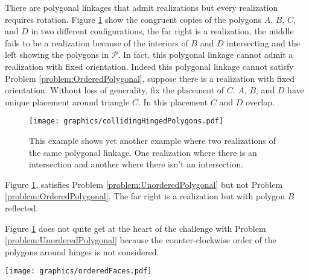\documentclass[10pt]{CSUNthesis}
\theoremstyle{plain}%
\theoremstyle{definition}
\theoremstyle{remark}
\renewcommand{\PP}{{\mathcal{P}}} %
\begin{document}
There are polygonal linkages that admit realizations but every realization requires rotation.
Figure \ref{fig:collidingHingedPolygons} show the congruent copies of the polygons $A$, $B$, $C$, and $D$ in two different configurations, the far right is a realization, the middle fails to be a realization because of the interiors of $B$ and $D$ intersecting and the left showing the polygons in $\PP$.  
In fact, this polygonal linkage cannot admit a realization with fixed orientation.
Indeed this polygonal linkage cannot satisfy Problem \ref{problem:OrderedPolygonal}, suppose there is a realization with fixed orientation.  
Without loss of generality, fix the placement of $C$.
$A$, $B$, and $D$ have unique placement around triangle $C$.  
In this placement $C$ and $D$ overlap.%
\begin{figure}[!htbp]\begin{center}
\texttt{[image: graphics/collidingHingedPolygons.pdf]}
\end{center} 
\caption{This example shows yet another example where two realizations of the same polygonal linkage. 
 One realization where there is an intersection and another where there isn't an intersection.}\label{fig:collidingHingedPolygons}
\end{figure}
Figure \ref{fig:collidingHingedPolygons}, satisfies Problem \ref{problem:UnorderedPolygonal} but not Problem \ref{problem:OrderedPolygonal}.
 The far right is a realization but with polygon $B$ reflected.

Figure \ref{fig:collidingHingedPolygons} does not quite get at the heart of the challenge with Problem \ref{problem:UnorderedPolygonal} because the counter-clockwise order of the polygons around hinges is not considered.

\begin{minipage}{\linewidth}
\begin{center}
\texttt{[image: graphics/orderedFaces.pdf]}
\end{center}
\label{fig:orderedFaces.pdf}
\end{minipage}
\end{document}
